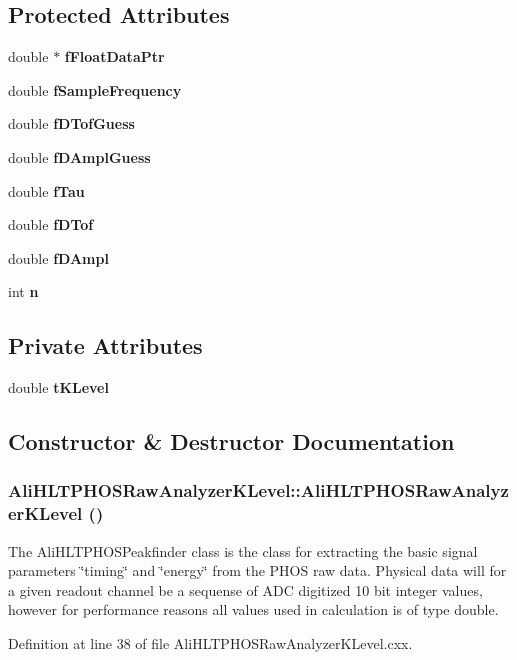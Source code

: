 \subsection*{Protected Attributes}
\begin{CompactItemize}
\item 
double $\ast$ {\bf f\-Float\-Data\-Ptr}
\item 
double {\bf f\-Sample\-Frequency}
\item 
double {\bf f\-DTof\-Guess}
\item 
double {\bf f\-DAmpl\-Guess}
\item 
double {\bf f\-Tau}
\item 
double {\bf f\-DTof}
\item 
double {\bf f\-DAmpl}
\item 
int {\bf n}
\end{CompactItemize}
\subsection*{Private Attributes}
\begin{CompactItemize}
\item 
double {\bf t\-KLevel}
\end{CompactItemize}


\subsection{Constructor \& Destructor Documentation}
\subsubsection{\setlength{\rightskip}{0pt plus 5cm}Ali\-HLTPHOSRaw\-Analyzer\-KLevel::Ali\-HLTPHOSRaw\-Analyzer\-KLevel ()}\label{classAliHLTPHOSRawAnalyzerKLevel_AliHLTPHOSRawAnalyzerKLevela0}


The Ali\-HLTPHOSPeakfinder class is the class for extracting the basic signal parameters \char`\"{}timing\char`\"{} and \char`\"{}energy\char`\"{} from the PHOS raw data. Physical data will for a given readout channel be a sequense of ADC digitized 10 bit integer values, however for performance reasons all values used in calculation is of type double. 

Definition at line 38 of file Ali\-HLTPHOSRaw\-Analyzer\-KLevel.cxx.

